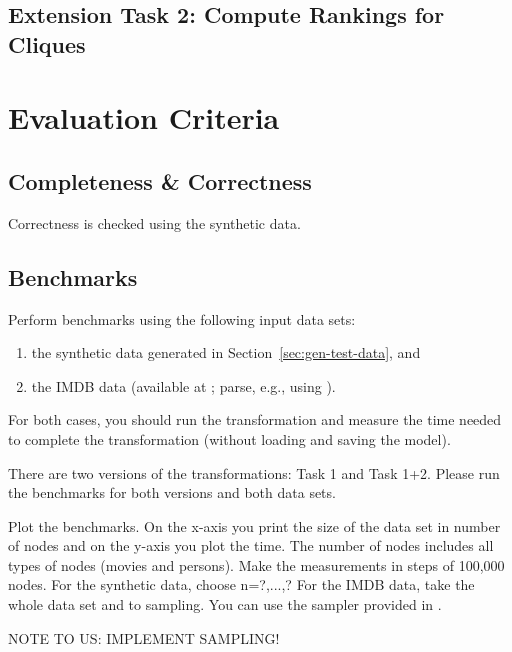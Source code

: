 \documentclass[a4paper]{article}
\begin{document}
\subsection{Extension Task 2: Compute Rankings for Cliques}


\section{Evaluation Criteria}

\subsection{Completeness \& Correctness}

Correctness is checked using the synthetic data.

\subsection{Benchmarks}

Perform benchmarks using the following input data sets:
\begin{enumerate}
\item the synthetic data generated in Section~\ref{sec:gen-test-data}, and 
\item the IMDB data (available at \cite{IMDBDATA}; parse, e.g., using \cite{IMDB2EMF}).
\end{enumerate}
For both cases, you should run the transformation and measure 
the time needed to complete the transformation (without loading 
and saving the model).

There are two versions of the transformations: Task 1 and Task 1+2.
Please run the benchmarks for both versions and both data sets.


Plot the benchmarks. On the x-axis you print the size of the data set
in number of nodes and on the y-axis you plot the time. The number of nodes
includes all types of nodes (movies and persons). Make the measurements in
steps of 100,000 nodes. For the synthetic data, choose n=?,...,?
For the IMDB data, take the whole data set and to sampling. You can use
the sampler provided in \cite{IMDB2EMF}. 

NOTE TO US: IMPLEMENT SAMPLING!





\end{document}
